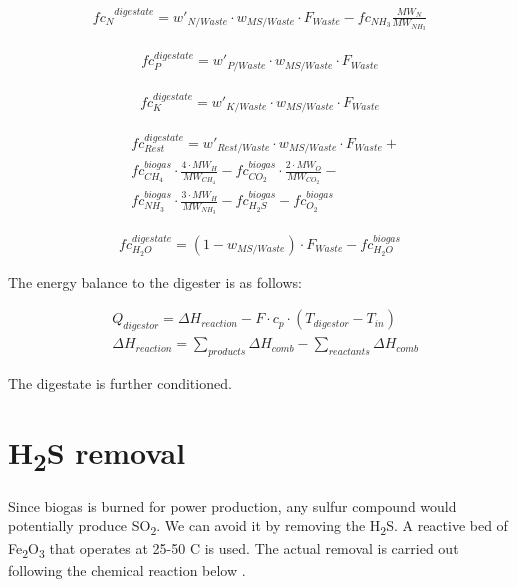 \begin{refsection}[referencesCh2]
\begin{align}
	{fc_{N}}^{digestate} = w'_{N/Waste} \cdot w_{MS/Waste} \cdot F_{Waste} - fc_{NH_{3}}  \frac{MW_{N}}{MW_{NH_{3}}} \label{eq:AnexAEq14}
\end{align}

\begin{align}
	fc_{P}^{digestate} = w'_{P/Waste} \cdot {w}_{MS/Waste} \cdot F_{Waste} \label{eq:AnexAEq15}
\end{align}

\begin{align}
	fc_K^{digestate} = w'_{K/Waste} \cdot w_{MS/Waste} \cdot F_{Waste} \label{eq:AnexAEq16}
\end{align}

\begin{align}
	& fc_{Rest}^{digestate} = w'_{Rest/Waste} \cdot w_{MS/Waste} \cdot F_{Waste} + \label{eq:AnexAEq17} \\
	& fc_{CH_{4}}^{biogas} \cdot \frac{4\cdot MW_{H}}{MW_{CH_{4}}} - fc_{CO_{2}}^{biogas} \cdot \frac{2 \cdot MW_{O}}{MW_{CO_{2}}} -  \nonumber \\
	& fc_{NH_{3}}^{biogas} \cdot \frac { 3 \cdot MW_{H}} {MW_{NH_{3}}} - fc_{H_{2}S}^{biogas} - fc_{O_{2}}^{biogas} \nonumber
\end{align}

\begin{align}
	fc_{H_{2}O}^{digestate} = \left( 1 - w_{MS/Waste}\right) \cdot F_{Waste} - fc_{H_{2}O}^{biogas} \label{eq:AnexAEq18}
\end{align}

The energy balance to the digester is as follows:

\begin{align}
	& Q_{digestor} = \Delta H_{reaction} - F \cdot c_p \cdot \left( T_{digestor} - T_{in} \right) \label{eq:AnexAEq19} \\
	& \Delta H_{reaction} = \sum\limits_{products} {\Delta H_{comb}}  - \sum\limits_{reactants} {\Delta H_{comb}} \nonumber
\end{align}

The digestate is further conditioned.

\section{H\textsubscript{2}S removal}
Since biogas is burned for power production, any sulfur compound would potentially produce SO\textsubscript{2}. We can avoid it by removing the H\textsubscript{2}S. A reactive bed of Fe\textsubscript{2}O\textsubscript{3} that operates at 25-50 \textdegree C is used. The actual removal is carried out following the chemical reaction below \citep{ryckebosch2011techniques}. 


\end{refsection}
